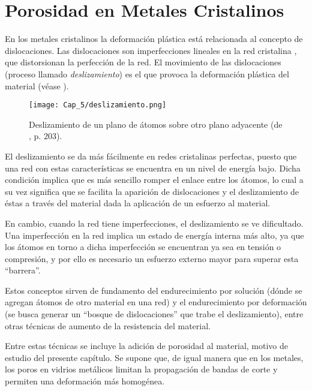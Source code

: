 
\section{Porosidad en Metales Cristalinos}
\label{S5_2}

En los metales cristalinos la deformación plástica está relacionada al concepto de dislocaciones. Las dislocaciones son imperfecciones lineales en
la red cristalina \citep{askeland98}, que distorsionan la perfección de la red. El movimiento de las dislocaciones (proceso llamado
\textit{deslizamiento}) es el que provoca la deformación plástica del material (véase ).

\begin{figure}[h!]
\centering
  \texttt{[image: Cap\_5/deslizamiento.png]}
  \caption[Deslizamiento de un plano de átomos sobre otro plano adyacente]{Deslizamiento de un plano de átomos sobre otro plano adyacente
  (de \cite{shackelford04}, p. 203).}
  \label{C5:fg:dislocaciones}
\end{figure}

El deslizamiento se da más fácilmente en redes cristalinas perfectas, puesto que una red con estas características se encuentra en un nivel
de energía bajo. Dicha condición implica que es más sencillo romper el enlace entre los átomos, lo cual a su vez significa que se facilita
la aparición de dislocaciones y el deslizamiento de éstas a través del material dada la aplicación de un esfuerzo al material.

En cambio, cuando la red tiene imperfecciones, el deslizamiento se ve dificultado. Una imperfección en la red implica un estado de energía
interna más alto, ya que los átomos en torno a dicha imperfección se encuentran ya sea en tensión o compresión, y por ello es necesario un
esfuerzo externo mayor para superar esta ``barrera''.

Estos conceptos sirven de fundamento del endurecimiento por solución (dónde se agregan átomos de otro material en una red) y el endurecimiento
por deformación (se busca generar un ``bosque de dislocaciones'' que trabe el deslizamiento), entre otras técnicas de aumento de la resistencia
del material. 

Entre estas técnicas se incluye la adición de porosidad al material, motivo de estudio del presente capítulo. Se supone que, de igual manera
que en los metales, los poros en vidrios metálicos limitan la propagación de bandas de corte y permiten
una deformación más homogénea.

